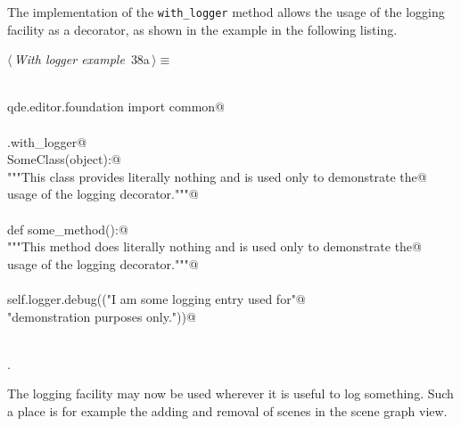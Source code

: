 \documentclass[
    a4paper,      %
    10pt,         %
    openright,    %
    notitlepage,  %
    parskip=half, %
]{scrreprt}       %
\theoremstyle{definition}                    %
\begin{document}
\begin{itemize}
\begin{flushleft}
\begin{minipage}{\linewidth}
\begin{list}{}{\setlength{\itemsep}{-\parsep}\setlength{\itemindent}{-\leftmargin}}
\item{}
\end{list}
\end{minipage}\vspace{4ex}
\end{flushleft}
\end{itemize}

The implementation of the \verb+with_logger+ method allows the usage of the
logging facility as a decorator, as shown in the example in the following
listing.

\begin{flushleft} \small
\begin{minipage}{\linewidth}\label{scrap45}\raggedright\small
{} $\langle\,${\itshape With logger example}\nobreak\ {\footnotesize {38a}}$\,\rangle\equiv$
\vspace{-1ex}
\begin{list}{}{} \item
\mbox{}\lstinline@@\\
\mbox{}\lstinline@from qde.editor.foundation import common@\\
\mbox{}\lstinline@@\\
\mbox{}\lstinline@common.with_logger@\\
\mbox{}\lstinline@def SomeClass(object):@\\
\mbox{}\lstinline@    """This class provides literally nothing and is used only to demonstrate the@\\
\mbox{}\lstinline@    usage of the logging decorator."""@\\
\mbox{}\lstinline@@\\
\mbox{}\lstinline@    def some_method():@\\
\mbox{}\lstinline@        """This method does literally nothing and is used only to demonstrate the@\\
\mbox{}\lstinline@        usage of the logging decorator."""@\\
\mbox{}\lstinline@@\\
\mbox{}\lstinline@        self.logger.debug(("I am some logging entry used for"@\\
\mbox{}\lstinline@                           "demonstration purposes only."))@\\
\mbox{}\lstinline@@\\
\mbox{}\lstinline@@{\NWsep}
\end{list}
\vspace{-1.5ex}
\footnotesize
\begin{list}{}{\setlength{\itemsep}{-\parsep}\setlength{\itemindent}{-\leftmargin}}
\item {\NWtxtMacroNoRef}.

\item{}
\end{list}
\end{minipage}\vspace{4ex}
\end{flushleft}
The logging facility may now be used wherever it is useful to log something.
Such a place is for example the adding and removal of scenes in the scene graph
view.
\end{document}

